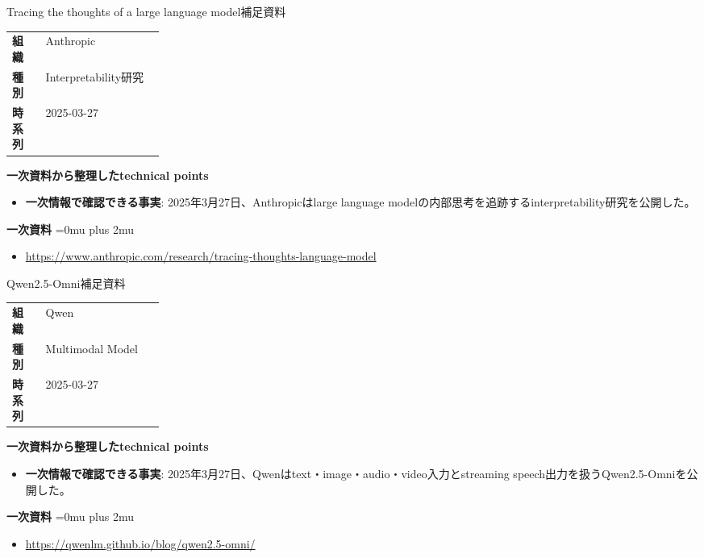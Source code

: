 \begin{technicalnote}{Tracing the thoughts of a large language model}{補足資料}
\begingroup
\begin{tabularx}{\linewidth}{@{}>{\bfseries}p{0.22\linewidth}X@{}}
組織 & Anthropic \\
種別 & Interpretability研究 \\
時系列 & 2025-03-27 \\
\end{tabularx}
\smallskip
{\bfseries 一次資料から整理したtechnical points}
\begin{itemize}[leftmargin=1.5em,itemsep=0.35em]
\item \textbf{一次情報で確認できる事実}: 2025年3月27日、Anthropicはlarge language modelの内部思考を追跡するinterpretability研究を公開した。
\end{itemize}
\begin{samepage}
{\bfseries 一次資料}
\begingroup\sloppy
\Urlmuskip=0mu plus 2mu\relax
\begin{itemize}[leftmargin=1.5em,itemsep=0.25em]
\item {\scriptsize\url{https://www.anthropic.com/research/tracing-thoughts-language-model}}
\end{itemize}
\endgroup
\end{samepage}
\endgroup
\end{technicalnote}
\medskip

\begin{technicalnote}{Qwen2.5-Omni}{補足資料}
\begingroup
\begin{tabularx}{\linewidth}{@{}>{\bfseries}p{0.22\linewidth}X@{}}
組織 & Qwen \\
種別 & Multimodal Model \\
時系列 & 2025-03-27 \\
\end{tabularx}
\smallskip
{\bfseries 一次資料から整理したtechnical points}
\begin{itemize}[leftmargin=1.5em,itemsep=0.35em]
\item \textbf{一次情報で確認できる事実}: 2025年3月27日、Qwenはtext・image・audio・video入力とstreaming speech出力を扱うQwen2.5-Omniを公開した。
\end{itemize}
\begin{samepage}
{\bfseries 一次資料}
\begingroup\sloppy
\Urlmuskip=0mu plus 2mu\relax
\begin{itemize}[leftmargin=1.5em,itemsep=0.25em]
\item {\scriptsize\url{https://qwenlm.github.io/blog/qwen2.5-omni/}}
\end{itemize}
\endgroup
\end{samepage}
\endgroup
\end{technicalnote}
\medskip

